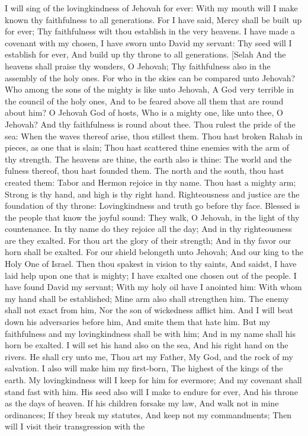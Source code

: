 I will sing of the lovingkindness of Jehovah for ever: With my mouth will I make known thy faithfulness to all generations.  For I have said, Mercy shall be built up for ever; Thy faithfulness wilt thou establish in the very heavens.  I have made a covenant with my chosen, I have sworn unto David my servant:  Thy seed will I establish for ever, And build up thy throne to all generations. [Selah  And the heavens shall praise thy wonders, O Jehovah; Thy faithfulness also in the assembly of the holy ones.  For who in the skies can be compared unto Jehovah? Who among the sons of the mighty is like unto Jehovah,  A God very terrible in the council of the holy ones, And to be feared above all them that are round about him?  O Jehovah God of hosts, Who is a mighty one, like unto thee, O Jehovah? And thy faithfulness is round about thee.  Thou rulest the pride of the sea: When the waves thereof arise, thou stillest them.  Thou hast broken Rahab in pieces, as one that is slain; Thou hast scattered thine enemies with the arm of thy strength.  The heavens are thine, the earth also is thine: The world and the fulness thereof, thou hast founded them.  The north and the south, thou hast created them: Tabor and Hermon rejoice in thy name.  Thou hast a mighty arm; Strong is thy hand, and high is thy right hand.  Righteousness and justice are the foundation of thy throne: Lovingkindness and truth go before thy face.  Blessed is the people that know the joyful sound: They walk, O Jehovah, in the light of thy countenance.  In thy name do they rejoice all the day; And in thy righteousness are they exalted.  For thou art the glory of their strength; And in thy favor our horn shall be exalted.  For our shield belongeth unto Jehovah; And our king to the Holy One of Israel.  Then thou spakest in vision to thy saints, And saidst, I have laid help upon one that is mighty; I have exalted one chosen out of the people.  I have found David my servant; With my holy oil have I anointed him:  With whom my hand shall be established; Mine arm also shall strengthen him.  The enemy shall not exact from him, Nor the son of wickedness afflict him.  And I will beat down his adversaries before him, And smite them that hate him.  But my faithfulness and my lovingkindness shall be with him; And in my name shall his horn be exalted.  I will set his hand also on the sea, And his right hand on the rivers.  He shall cry unto me, Thou art my Father, My God, and the rock of my salvation.  I also will make him my first-born, The highest of the kings of the earth.  My lovingkindness will I keep for him for evermore; And my covenant shall stand fast with him.  His seed also will I make to endure for ever, And his throne as the days of heaven.  If his children forsake my law, And walk not in mine ordinances;  If they break my statutes, And keep not my commandments;  Then will I visit their transgression with the 